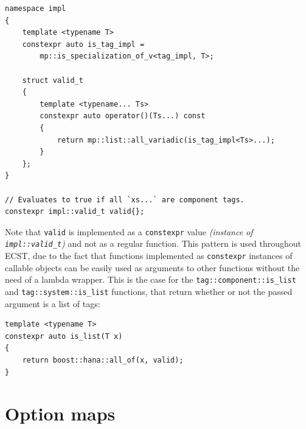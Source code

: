 \documentclass[twoside, 12pt, a4paper, openany]{book}
\begin{document}
\begin{verbatim}
namespace impl
{
    template <typename T>
    constexpr auto is_tag_impl =
        mp::is_specialization_of_v<tag_impl, T>;

    struct valid_t
    {
        template <typename... Ts>
        constexpr auto operator()(Ts...) const
        {
            return mp::list::all_variadic(is_tag_impl<Ts>...);
        }
    };
}

// Evaluates to true if all `xs...` are component tags.
constexpr impl::valid_t valid{};
\end{verbatim}

Note that
\texttt{valid}
is implemented as a
\texttt{constexpr}
value \emph{(instance of
\texttt{impl::valid_t})}
and not as a regular function. This pattern is used throughout ECST, due
to the fact that functions implemented as
\texttt{constexpr}
instances of callable objects can be easily used as arguments to other
functions without the need of a lambda wrapper. This is the case for the
\texttt{tag::component::is_list}
and
\texttt{tag::system::is_list}
functions, that return whether or not the passed argument is a list of
tags:

\begin{verbatim}
template <typename T>
constexpr auto is_list(T x)
{
    return boost::hana::all_of(x, valid);
}
\end{verbatim}

\hypertarget{metaprogramming_option_maps}{\section{Option
maps}\label{metaprogramming_option_maps}}
\end{document}
